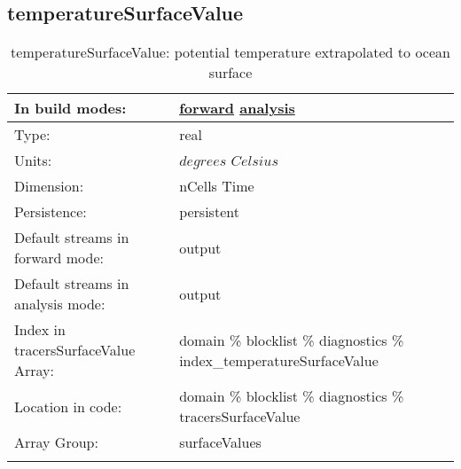\subsection[temperatureSurfaceValue]{temperatureSurfaceValue}
\label{subsec:var_sec_diagnostics_temperatureSurfaceValue}
\begin{center}
\begin{longtable}{| p{2.0in} | p{4.0in} |}
        \hline 
        In build modes: & \hyperref[subsec:forward_var_tab_diagnostics]{forward} \hyperref[subsec:analysis_var_tab_diagnostics]{analysis} \\
        \hline 
        Type: & real \\
        \hline 
        Units: & $degrees$ $Celsius$ \\
        \hline 
        Dimension: & nCells Time \\
        \hline 
        Persistence: & persistent \\
        \hline 
		 Default streams in forward mode: &  output \\
        \hline 
		 Default streams in analysis mode: &  output \\
        \hline 
		 Index in tracersSurfaceValue Array: & domain \% blocklist \% diagnostics \% index\_temperatureSurfaceValue \\
		 \hline 
		 Location in code: & domain \% blocklist \% diagnostics \% tracersSurfaceValue \\
		 \hline 
		 Array Group: & surfaceValues \\
		 \hline 
    \caption{temperatureSurfaceValue: potential temperature extrapolated to ocean surface}
\end{longtable}
\end{center}
